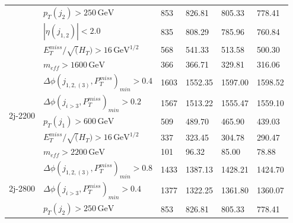 \documentclass[11pt]{article}
\newcommand{\gev}{\ensuremath{\,\text{GeV}}}
\begin{document}
\begin{table}[t]
\begin{tabularx}{\textwidth}{llllll}
                         & $p_T(j_2)>250\gev$                             & 853                   & 826.81                   & 805.33                   & 778.41                   \\
                         & $|\eta(j_{1,2})|<2.0$                          & 835                   & 808.29                   & 785.96                   & 760.84                   \\
                         & $E_T^{miss}/\sqrt(H_T)>16\gev^{1/2}$           & 568                   & 541.33                   & 513.58                   & 500.30                   \\
                         & $m_{eff}>1600\gev$                             & 366                   & 366.71                   & 329.81                   & 316.06                   \\
\midrule
\multirow{5}{*}{2j-2200} & $\Delta\phi(j_{1,2,(3)},P_T^{miss})_{min}>0.4$ & 1603                  & 1552.35                  & 1597.00                  & 1598.52                  \\
                         & $\Delta\phi(j_{i>3},P_T^{miss})_{min}>0.2$     & 1567                  & 1513.22                  & 1555.47                  & 1559.10                  \\
                         & $p_T(j_1)>600\gev$                             & 509                   & 489.70                   & 465.90                   & 439.03                   \\
                         & $E_T^{miss}/\sqrt(H_T)>16\gev^{1/2}$           & 337                   & 323.45                   & 304.78                   & 290.47                   \\
                         & $m_{eff}>2200\gev$                             & 101                   & 96.32                    & 85.00                    & 78.88                    \\
\midrule
\multirow{6}{*}{2j-2800} & $\Delta\phi(j_{1,2,(3)},P_T^{miss})_{min}>0.8$ & 1433                  & 1387.13                  & 1428.21                  & 1424.70                  \\
                         & $\Delta\phi(j_{i>3},P_T^{miss})_{min}>0.4$     & 1377                  & 1322.25                  & 1361.80                  & 1360.07                  \\
                         & $p_T(j_2)>250\gev$                             & 853                   & 826.81                   & 805.33                   & 778.41                   \\

\end{tabularx}
\end{table}
\end{document}
